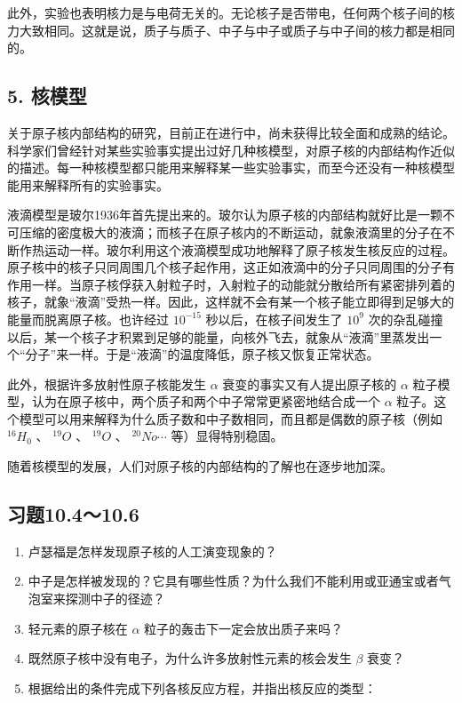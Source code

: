此外，实验也表明核力是与电荷无关的。无论核子是否带电，任何两个核子间的核力大致相同。这就是说，质子与质子、中子与中子或质子与中子间的核力都是相同的。

\subsection{5. 核模型}

关于原子核内部结构的研究，目前正在进行中，尚未获得比较全面和成熟的结论。科学家们曾经针对某些实验事实提出过好几种核模型，对原子核的内部结构作近似的描述。每一种核模型都只能用来解释某一些实验事实，而至今还没有一种核模型能用来解释所有的实验事实。

液滴模型是玻尔1936年首先提出来的。玻尔认为原子核的内部结构就好比是一颗不可压缩的密度极大的液滴；而核子在原子核内的不断运动，就象液滴里的分子在不断作热运动一样。玻尔利用这个液滴模型成功地解释了原子核发生核反应的过程。原子核中的核子只同周围几个核子起作用，这正如液滴中的分子只同周围的分子有作用一样。当原子核俘获入射粒子时，入射粒子的动能就分散给所有紧密排列着的核子，就象``液滴''受热一样。因此，这样就不会有某一个核子能立即得到足够大的能量而脱离原子核。也许经过
\(10^{-15}\) 秒以后，在核子间发生了 \(10^{9}\)
次的杂乱碰撞以后，某一个核子才积累到足够的能量，向核外飞去，就象从``液滴''里蒸发出一个``分子''来一样。于是``液滴''的温度降低，原子核又恢复正常状态。

此外，根据许多放射性原子核能发生 \(\alpha\) 衰变的事实又有人提出原子核的
\(\alpha\)
粒子模型，认为在原子核中，两个质子和两个中子常常更紧密地结合成一个
\(\alpha\)
粒子。这个模型可以用来解释为什么质子数和中子数相同，而且都是偶数的原子核（例如
\({}^{16}H_{0}\) 、 \({}^{19}O\) 、 \({}^{19}O\) 、 \({}^{20}No\cdots\)
等）显得特别稳固。

随着核模型的发展，人们对原子核的内部结构的了解也在逐步地加深。

\subsection{习题10.4～10.6}

\begin{enumerate}
\item
  卢瑟福是怎样发现原子核的人工演变现象的？
\item
  中子是怎样被发现的？它具有哪些性质？为什么我们不能利用或亚通宝或者气泡室来探测中子的径迹？
\item
  轻元素的原子核在 \(\alpha\) 粒子的轰击下一定会放出质子来吗？
\item
  既然原子核中没有电子，为什么许多放射性元素的核会发生 \(\beta\) 衰变？
\item
  根据给出的条件完成下列各核反应方程，并指出核反应的类型：
\end{enumerate}

